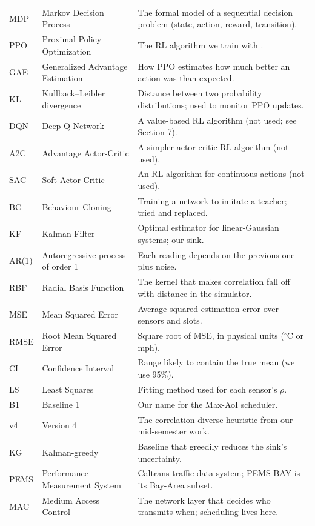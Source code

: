 {\begin{longtable}{@{}p{2.6cm}p{5.2cm}p{7.6cm}@{}}
MDP & Markov Decision Process & The formal model of a sequential decision problem (state, action, reward, transition). \\
PPO & Proximal Policy Optimization & The RL algorithm we train with \cite{23}. \\
GAE & Generalized Advantage Estimation & How PPO estimates how much better an action was than expected. \\
KL & Kullback--Leibler divergence & Distance between two probability distributions; used to monitor PPO updates. \\
DQN & Deep Q-Network & A value-based RL algorithm (not used; see Section 7). \\
A2C & Advantage Actor-Critic & A simpler actor-critic RL algorithm (not used). \\
SAC & Soft Actor-Critic & An RL algorithm for continuous actions (not used). \\
BC & Behaviour Cloning & Training a network to imitate a teacher; tried and replaced. \\
KF & Kalman Filter & Optimal estimator for linear-Gaussian systems; our sink. \\
AR(1) & Autoregressive process of order 1 & Each reading depends on the previous one plus noise. \\
RBF & Radial Basis Function & The kernel that makes correlation fall off with distance in the simulator. \\
MSE & Mean Squared Error & Average squared estimation error over sensors and slots. \\
RMSE & Root Mean Squared Error & Square root of MSE, in physical units ($^\circ$C or mph). \\
CI & Confidence Interval & Range likely to contain the true mean (we use 95\%). \\
LS & Least Squares & Fitting method used for each sensor's $\rho$. \\
B1 & Baseline 1 & Our name for the Max-AoI scheduler. \\
v4 & Version 4 & The correlation-diverse heuristic from our mid-semester work. \\
KG & Kalman-greedy & Baseline that greedily reduces the sink's uncertainty. \\
PEMS & Performance Measurement System & Caltrans traffic data system; PEMS-BAY is its Bay-Area subset. \\
MAC & Medium Access Control & The network layer that decides who transmits when; scheduling lives here. \\

\end{longtable}}
